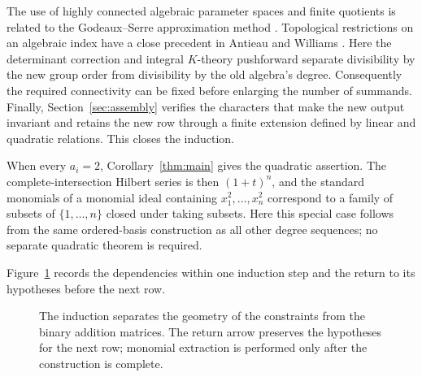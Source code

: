 The use of highly connected algebraic parameter spaces and finite
quotients is related to the Godeaux--Serre approximation method
\cite[Section~5]{Totaro99}. Topological restrictions on an algebraic
index have a close precedent in
Antieau and Williams \cite[Theorem~3.4]{AntieauWilliams13}.
Here the determinant correction and integral \(K\)-theory pushforward
separate divisibility by the new group order from divisibility by the
old algebra's degree. Consequently the required connectivity can be
fixed before enlarging the number of summands. Finally,
Section~\ref{sec:assembly} verifies the characters that make the new
output invariant and retains the new row through a finite extension
defined by linear and quadratic relations. This closes the induction.

When every $a_i=2$, Corollary~\ref{thm:main} gives the quadratic assertion.
The complete-intersection Hilbert series is then $(1+t)^n$, and the
standard monomials of a monomial ideal containing $x_1^2,\ldots,x_n^2$
correspond to a family of subsets of $\{1,\ldots,n\}$ closed under
taking subsets. Here this
special case follows from the same ordered-basis construction as all
other degree sequences; no separate quadratic theorem is required.

Figure~\ref{fig:construction} records the dependencies within one induction
step and the return to its hypotheses before the next row.

\begin{figure}[!htbp]
\centering
{}
\caption{The induction separates the geometry of the constraints from the binary addition matrices. The return arrow preserves the hypotheses for the next row; monomial extraction is performed only after the construction is complete.}
\label{fig:construction}
\end{figure}

